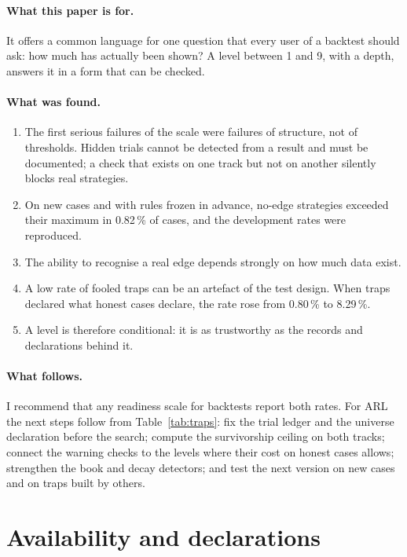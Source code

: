\documentclass[11pt]{article}
\begin{document}
\paragraph{What this paper is for.} It offers a common language for one question that every user of a backtest should
ask: how much has actually been shown? A level between 1 and 9, with a depth, answers it in a form that can be checked.

\paragraph{What was found.}
\begin{enumerate}
\item The first serious failures of the scale were failures of structure, not of thresholds. Hidden trials cannot be
detected from a result and must be documented; a check that exists on one track but not on another silently blocks real
strategies.
\item On new cases and with rules frozen in advance, no-edge strategies exceeded their maximum in 0.82\,\% of cases, and
the development rates were reproduced.
\item The ability to recognise a real edge depends strongly on how much data exist.
\item A low rate of fooled traps can be an artefact of the test design. When traps declared what honest cases declare,
the rate rose from 0.80\,\% to 8.29\,\%.
\item A level is therefore conditional: it is as trustworthy as the records and declarations behind it.
\end{enumerate}

\paragraph{What follows.} I recommend that any readiness scale for backtests report both rates. For ARL the next steps
follow from Table~\ref{tab:traps}: fix the trial ledger and the universe declaration before the search; compute the
survivorship ceiling on both tracks; connect the warning checks to the levels where their cost on honest cases allows;
strengthen the book and decay detectors; and test the next version on new cases and on traps built by others.

\section*{Availability and declarations}
\end{document}
